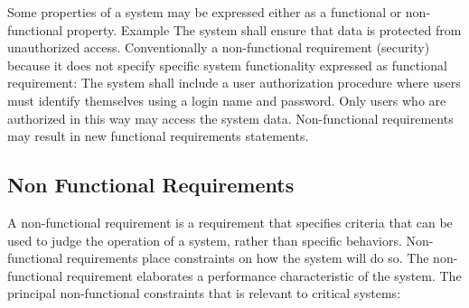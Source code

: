 Some properties of a system may be expressed either as a functional or non-functional property. Example The system shall ensure that data is protected from unauthorized access. Conventionally a non-functional requirement (security) because it does not specify specific system functionality expressed as functional requirement: The system shall include a user authorization procedure where users must identify themselves using a login name and password. Only users who are authorized in this way may access the system data. Non-functional requirements may result in new functional requirements statements.

%
\subsection{Non Functional Requirements}

A non-functional requirement is a requirement that specifies criteria that can be used to judge the operation of a system, rather than specific behaviors. Non-functional requirements place constraints on how the system will do so. The non-functional requirement elaborates a performance characteristic of the system. The principal non-functional constraints that is relevant to critical systems: 

